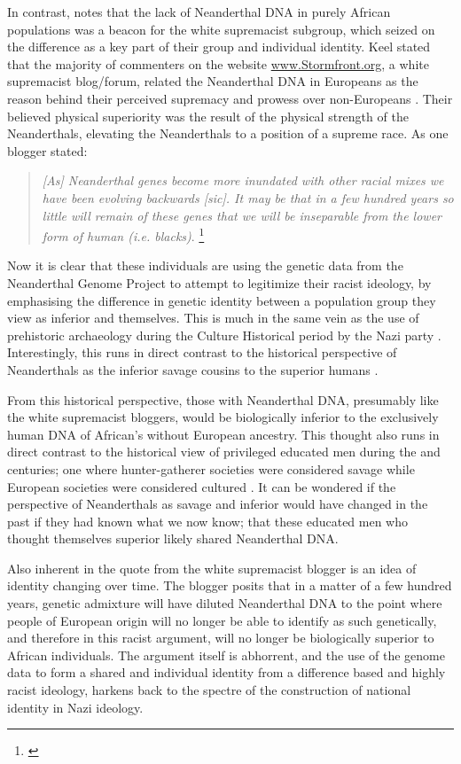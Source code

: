 In contrast, \textcite{Keel_2010} notes that the lack of Neanderthal DNA in purely African populations was a beacon for the white supremacist subgroup, which seized on the difference as a key part of their group and individual identity. Keel stated that the majority of commenters on the website \url{www.Stormfront.org}, a white supremacist blog/forum, related the Neanderthal DNA in Europeans as the reason behind their perceived supremacy and prowess over non-Europeans \parencite{Keel_2010}. Their believed physical superiority was the result of the physical strength of the Neanderthals, elevating the Neanderthals to a position of a supreme race. As one blogger stated:

\blockquote{\textit{[As] Neanderthal genes become more inundated with other racial mixes we have been evolving backwards [sic]. It may be that in a few hundred years so little will remain of these genes that we will be inseparable from the lower form of human (i.e. blacks)}.
	\footnote{\textcite{Keel_2010}}}
Now it is clear that these individuals are using the genetic data from the Neanderthal Genome Project to attempt to legitimize their racist ideology, by emphasising the difference in genetic identity between a population group they view as inferior and themselves. This is much in the same vein as the use of prehistoric archaeology during the Culture Historical period by the Nazi party \parencite{Arnold_1992}. Interestingly, this runs in direct contrast to the historical perspective of Neanderthals as the inferior savage cousins to the superior humans \parencite{King_1864}. 

From this historical perspective, those with Neanderthal DNA, presumably like the white supremacist bloggers, would be biologically inferior to the exclusively human DNA of African's without European ancestry. This thought also runs in direct contrast to the historical view of privileged educated men during the  and  centuries; one where hunter-gatherer societies were considered savage while European societies were considered cultured \parencite{Ellingson_2001}. It can be wondered if the perspective of Neanderthals as savage and inferior would have changed in the past if they had known what we now know; that these educated men who thought themselves superior likely shared Neanderthal DNA.

Also inherent in the quote from the white supremacist blogger is an idea of identity changing over time. The blogger posits that in a matter of a few hundred years, genetic admixture will have diluted Neanderthal DNA to the point where people of European origin will no longer be able to identify as such genetically, and therefore in this racist argument, will no longer be biologically superior to African individuals. The argument itself is abhorrent, and the use of the genome data to form a shared and individual identity from a difference based and highly racist ideology, harkens back to the spectre of the construction of national identity in Nazi ideology. 

